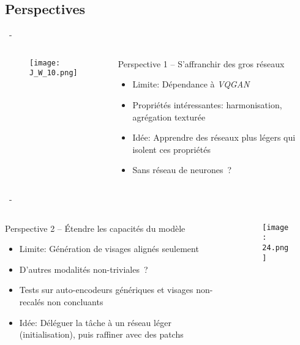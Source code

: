 \documentclass[aspectratio=169, 22pt]{beamer}
\begin{document}
\subsection{Perspectives}
\begin{frame}{\secname~- \subsecname}
  \begin{columns}
    \begin{column}{0.5\linewidth}
      \begin{figure}
        \centering
        \texttt{[image: J\_W\_10.png]}
      \end{figure}
    \end{column}
    \begin{column}{0.5\linewidth}
      \begin{block}{Perspective 1 – S'affranchir des gros réseaux}
        \begin{itemize}
        \item \alert{Limite}: Dépendance à \emph{VQGAN}
        \item Propriétés intéressantes: harmonisation, agrégation texturée

        \item \alert{Idée}: Apprendre des réseaux plus légers qui isolent ces propriétés
        \item Sans réseau de neurones ?
        \end{itemize}

      \end{block}
    \end{column}
  \end{columns}
\end{frame}

\begin{frame}{\secname~- \subsecname}
  \begin{columns}
    \begin{column}{0.6\linewidth}
      \begin{block}{Perspective 2 – Étendre les capacités du modèle}        
        \begin{itemize}
        \item \alert{Limite}: Génération de visages alignés seulement
        \item D'autres modalités non-triviales ?

        \item Tests sur auto-encodeurs génériques et visages non-recalés non concluants
        \item \alert{Idée}: Déléguer la tâche à un réseau léger
          (initialisation), puis raffiner avec des patchs
        \end{itemize}
      \end{block}
    \end{column}
    \begin{column}{0.4\linewidth}
      \begin{figure}
        \centering
        \texttt{[image: 24.png]}
      \end{figure}
    \end{column}
  \end{columns}
\end{frame}
\end{document}
